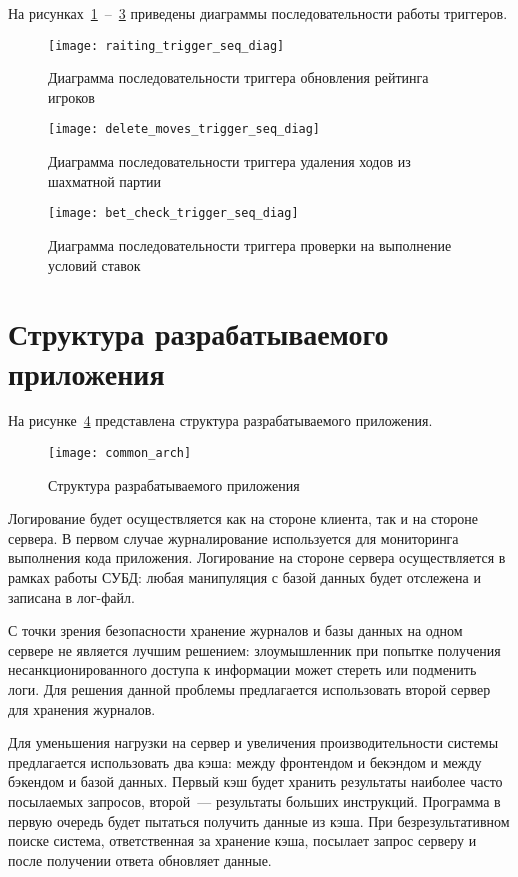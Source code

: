 На рисунках~\ref{raiting_trigger_seq_diag}~--~\ref{bet_check_trigger_seq_diag} приведены диаграммы последовательности работы триггеров.
\begin{figure}[H]
	\centering
	\texttt{[image: raiting\_trigger\_seq\_diag]}
	\caption{Диаграмма последовательности триггера обновления рейтинга игроков}
	\label{raiting_trigger_seq_diag}
\end{figure}
\begin{figure}[H]
	\centering
	\texttt{[image: delete\_moves\_trigger\_seq\_diag]}
	\caption{Диаграмма последовательности триггера удаления ходов из шахматной партии}
	\label{delete_moves_trigger_seq_diag}
\end{figure}
\begin{figure}[H]
	\centering
	\texttt{[image: bet\_check\_trigger\_seq\_diag]}
	\caption{Диаграмма последовательности триггера проверки на выполнение условий ставок}
	\label{bet_check_trigger_seq_diag}
\end{figure}

\section{Структура разрабатываемого приложения}

На рисунке~\ref{common_arch} представлена структура разрабатываемого приложения.
\begin{figure}[H]
	\centering
	\texttt{[image: common\_arch]}
	\caption{Структура разрабатываемого приложения}
	\label{common_arch}
\end{figure}

Логирование будет осуществляется как на стороне клиента, так и на стороне сервера. В первом случае журналирование используется для мониторинга выполнения кода приложения.
Логирование на стороне сервера осуществляется в рамках работы СУБД: любая манипуляция с базой данных будет отслежена и записана в лог-файл.

С точки зрения безопасности хранение журналов и базы данных на одном сервере не является лучшим решением: злоумышленник при попытке получения несанкционированного доступа к информации может стереть или подменить логи.
Для решения данной проблемы предлагается использовать второй сервер для хранения журналов.

Для уменьшения нагрузки на сервер и увеличения производительности системы предлагается использовать два кэша: между фронтендом и бекэндом и между бэкендом и базой данных.
Первый кэш будет хранить результаты наиболее часто посылаемых запросов, второй~--- результаты больших инструкций. Программа в первую очередь будет пытаться получить данные из кэша.
При безрезультативном поиске система, ответственная за хранение кэша, посылает запрос серверу и после получении ответа обновляет данные.

\clearpage
